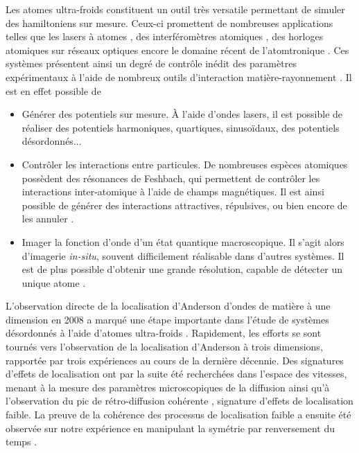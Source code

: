 Les atomes ultra-froids constituent un outil très versatile permettant de simuler des hamiltoniens sur mesure. Ceux-ci promettent de nombreuses applications telles que les lasers à atomes \citep{robins2013atom}, des interféromètres atomiques \citep{canuel2014matter}, des horloges atomiques sur réseaux optiques \citep{derevianko2011colloquium} encore le domaine récent de l'atomtronique \citep{eckel2014hysteresis}. Ces systèmes présentent ainsi un degré de contrôle inédit des paramètres expérimentaux à l'aide de nombreux outils d'interaction matière-rayonnement \citep{bloch2012quantum}. Il est en effet possible de
\begin{itemize}
\item[\textendash] Générer des potentiels sur mesure. À l'aide d'ondes lasers, il est possible de réaliser des potentiels harmoniques, quartiques, sinusoïdaux, des potentiels désordonnés...
\item[\textendash] Contrôler les interactions entre particules. De nombreuses espèces atomiques possèdent des résonances de Feshbach, qui permettent de contrôler les interactions inter-atomique à l'aide de champs magnétiques. Il est ainsi possible de générer des interactions attractives, répulsives, ou bien encore de les annuler \citep{walraven2010elements}.
\item[\textendash] Imager la fonction d'onde d'un état quantique macroscopique. Il s'agit alors d'imagerie \emph{in-situ}, souvent difficilement réalisable dans d'autres systèmes. Il est de plus possible d'obtenir une grande résolution, capable de détecter un unique atome \citep{ott2016single}.
\end{itemize}



L'observation directe de la localisation d'Anderson d'ondes de matière à une dimension en 2008 a marqué une étape importante dans l'étude de systèmes désordonnés à l'aide d'atomes ultra-froids \citep{billy2008direct,roati2008anderson}. Rapidement, les efforts se sont tournés vers l'observation de la localisation d'Anderson à trois dimensions, rapportée par trois expériences \citep{jendrzejewski2012three,kondov2011three,semeghini2015measurement} au cours de la dernière décennie. Des signatures d'effets de localisation ont par la suite été recherchées dans l'espace des vitesses, menant à la mesure des paramètres microscopiques de la diffusion \citep{richard2019elastic} ainsi qu'à l'observation du pic de rétro-diffusion cohérente \citep{jendrzejewski2012coherent}, signature d'effets de localisation faible. La preuve de la cohérence des processus de localisation faible a ensuite été observée sur notre expérience en manipulant la symétrie par renversement du temps \citep{muller2015suppression}. 

